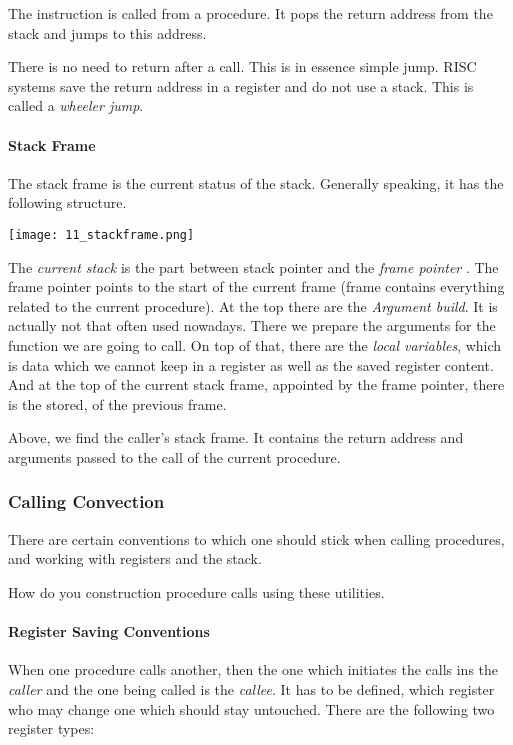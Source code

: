 The instruction  is called from a procedure. It pops the return address from the stack and jumps to this address.

There is no need to return after a call. This is in essence simple jump. RISC systems save the return address in a register and do not use a stack. This is called a \textit{wheeler jump}.

\paragraph{Stack Frame}
The stack frame is the current status of the stack. Generally speaking, it has the following structure.

\texttt{[image: 11\_stackframe.png]}

The \textit{current stack} is the part between stack pointer and the \textit{frame pointer} . The frame pointer points to the start of the current frame (frame contains everything related to the current procedure). At the top there are the \textit{Argument build}. It is actually not that often used nowadays. There we prepare the arguments for the function we are going to call. On top of that, there are the \textit{local variables}, which is data which we cannot keep in a register as well as the saved register content. And at the top of the current stack frame, appointed by the frame pointer, there is the  stored, of the previous frame.

Above, we find the caller's stack frame. It contains the return address and arguments passed to the call of the current procedure.

\subsubsection{Calling Convection}
There are certain conventions to which one should stick when calling procedures, and working with registers and the stack.

How do you construction procedure calls using these utilities.

\paragraph{Register Saving Conventions}
When one procedure calls another, then the one which initiates the calls ins the \textit{caller} and the one being called is the \textit{callee}. It has to be defined, which register who may change one which should stay untouched. There are the following two register types:

